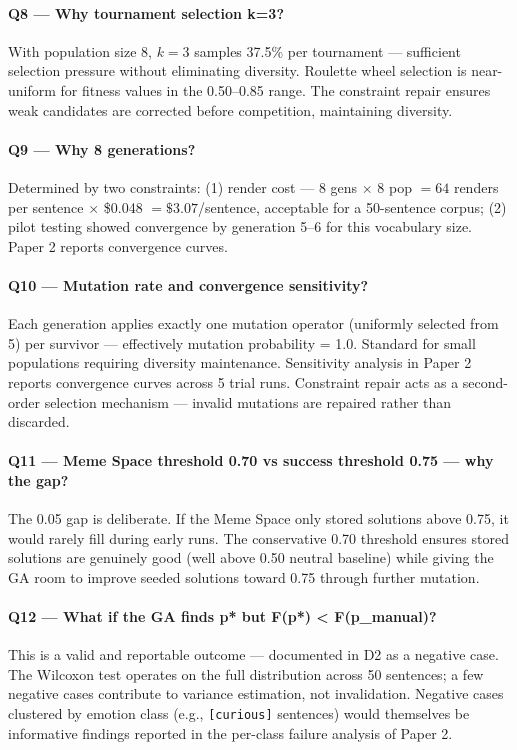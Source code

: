 \documentclass[12pt,a4paper]{article}
\begin{document}
\paragraph{Q8 --- Why tournament selection k=3?}
With population size 8, $k=3$ samples 37.5\% per tournament --- sufficient selection pressure without eliminating diversity. Roulette wheel selection is near-uniform for fitness values in the 0.50--0.85 range. The constraint repair ensures weak candidates are corrected before competition, maintaining diversity.

\paragraph{Q9 --- Why 8 generations?}
Determined by two constraints: (1) render cost --- 8 gens $\times$ 8 pop $= 64$ renders per sentence $\times$ \$0.048 $= \$3.07$/sentence, acceptable for a 50-sentence corpus; (2) pilot testing showed convergence by generation 5--6 for this vocabulary size. Paper 2 reports convergence curves.

\paragraph{Q10 --- Mutation rate and convergence sensitivity?}
Each generation applies exactly one mutation operator (uniformly selected from 5) per survivor --- effectively mutation probability = 1.0. Standard for small populations requiring diversity maintenance. Sensitivity analysis in Paper 2 reports convergence curves across 5 trial runs. Constraint repair acts as a second-order selection mechanism --- invalid mutations are repaired rather than discarded.

\paragraph{Q11 --- Meme Space threshold 0.70 vs success threshold 0.75 --- why the gap?}
The 0.05 gap is deliberate. If the Meme Space only stored solutions above 0.75, it would rarely fill during early runs. The conservative 0.70 threshold ensures stored solutions are genuinely good (well above 0.50 neutral baseline) while giving the GA room to improve seeded solutions toward 0.75 through further mutation.

\paragraph{Q12 --- What if the GA finds p* but F(p*) < F(p\_manual)?}
This is a valid and reportable outcome --- documented in D2 as a negative case. The Wilcoxon test operates on the full distribution across 50 sentences; a few negative cases contribute to variance estimation, not invalidation. Negative cases clustered by emotion class (e.g., \texttt{[curious]} sentences) would themselves be informative findings reported in the per-class failure analysis of Paper 2.
\end{document}
